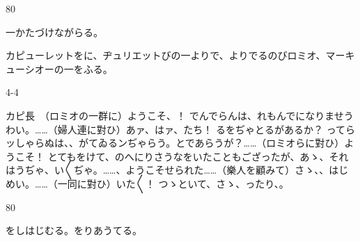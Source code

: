 \documentclass[tate,paper=b6j,jafontsize=9pt]{jlreq}
\begin{document}
\begin{azconvIndented}{8\zw}{0\zw}

一かたづけながらる。

カピューレットをに、ヂュリエットびの一よりで、よりでるのびロミオ、マーキューシオーの一をふる。

\end{azconvIndented}
\begin{azconvIndented}{4\zw}{-4\zw}

カピ長　（ロミオの一群に）ようこそ、！ でんでらんは、れもんでになりませうわい。……（婦人連に對ひ）あァ、はァ、たち！ るをぢゃとるがあるか？ ってらッしゃらぬは、、がてゐるンぢゃらう。とであらうが？……（ロミオらに對ひ）ようこそ！ とてもをけて、のへにりさうなをいたこともござったが、あゝ、それはうぢゃ、い{〳〵}ぢゃ。……、ようこそせられた……（樂人を顧みて）さゝ、、はじめい。……（一同に對ひ）いた{〳〵}！ つゝといて、さゝ、ったり、。

\end{azconvIndented}
\begin{azconvIndented}{8\zw}{0\zw}

をしはじむる。をりあうてる。

\end{azconvIndented}
\end{document}
